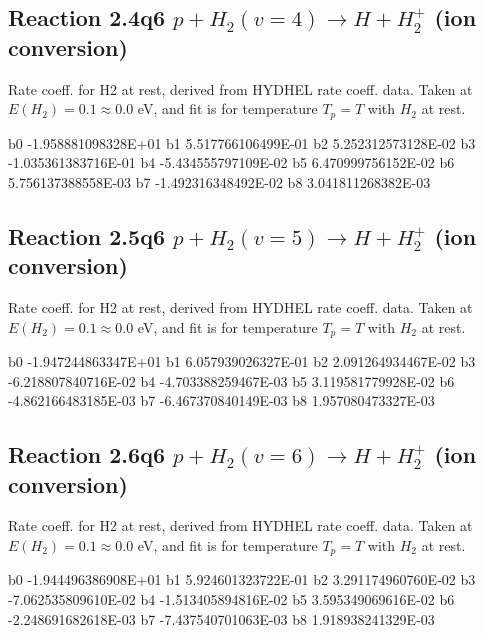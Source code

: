 \documentclass[12pt,dvipdfmx]{article}
\begin{document}
\newpage
\subsection{
Reaction 2.4q6
$ p + H_2(v=4) \rightarrow H + H_2^+$ (ion conversion)
}
Rate coeff. for H2 at rest, derived from HYDHEL rate coeff. data.
Taken at $E(H_2) = 0.1 \approx 0.0$ eV,  and fit is for temperature $T_p=T$ with $H_2$ at rest.

\begin{{small}}\begin{{verbatim}}

  b0 -1.958881098328E+01  b1  5.517766106499E-01  b2  5.252312573128E-02
  b3 -1.035361383716E-01  b4 -5.434555797109E-02  b5  6.470999756152E-02
  b6  5.756137388558E-03  b7 -1.492316348492E-02  b8  3.041811268382E-03

\end{{verbatim}}\end{{small}}

\newpage
\subsection{
Reaction 2.5q6
$ p + H_2(v=5) \rightarrow H + H_2^+$ (ion conversion)
}
Rate coeff. for H2 at rest, derived from HYDHEL rate coeff. data.
Taken at $E(H_2) = 0.1 \approx 0.0$ eV,  and fit is for temperature $T_p=T$ with $H_2$ at rest.

\begin{{small}}\begin{{verbatim}}

  b0 -1.947244863347E+01  b1  6.057939026327E-01  b2  2.091264934467E-02
  b3 -6.218807840716E-02  b4 -4.703388259467E-03  b5  3.119581779928E-02
  b6 -4.862166483185E-03  b7 -6.467370840149E-03  b8  1.957080473327E-03

\end{{verbatim}}\end{{small}}

\newpage
\subsection{
Reaction 2.6q6
$ p + H_2(v=6) \rightarrow H + H_2^+$ (ion conversion)
}
Rate coeff. for H2 at rest, derived from HYDHEL rate coeff. data.
Taken at $E(H_2) = 0.1 \approx 0.0$ eV,  and fit is for temperature $T_p=T$ with $H_2$ at rest.

\begin{{small}}\begin{{verbatim}}

  b0 -1.944496386908E+01  b1  5.924601323722E-01  b2  3.291174960760E-02
  b3 -7.062535809610E-02  b4 -1.513405894816E-02  b5  3.595349069616E-02
  b6 -2.248691682618E-03  b7 -7.437540701063E-03  b8  1.918938241329E-03

\end{{verbatim}}\end{{small}}
\end{document}
